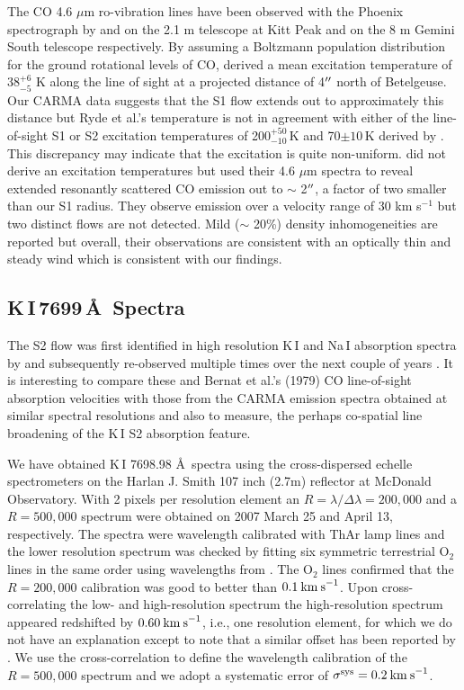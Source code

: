 \documentclass[iop]{emulateapj}
\begin{document}
The CO 4.6 $\mu$m ro-vibration lines have been observed with the Phoenix spectrograph \citep{1998SPIE.3354..810H} by \cite{1999A&A...347L..35R} and \cite{2009AJ....137.3558S} on the 2.1 m telescope at Kitt Peak and on the 8 m Gemini South telescope respectively. By assuming a Boltzmann population distribution for the ground rotational levels of CO, \cite{1999A&A...347L..35R}  derived a mean excitation temperature of 38${}^{+6}_{-5}$ K along the line of sight at a projected distance of 4$\mbox{$^{\prime\prime}$}$ north of Betelgeuse. Our CARMA data suggests that the S1 flow extends out to approximately this distance but Ryde et al.'s temperature is not in agreement with either of the line-of-sight S1 or S2 excitation temperatures of 200${}^{+50}_{-10}$\,K and 70$\pm 10$\,K derived by \cite{1979ApJ...233L.135B}. This discrepancy may indicate that the excitation is quite non-uniform.
\cite{2009AJ....137.3558S} did not derive an excitation temperatures but used their 4.6 $\mu$m spectra to reveal extended resonantly scattered CO emission out to $\sim$ 2$\mbox{$^{\prime\prime}$}$, a factor of two smaller than our S1 radius. They observe emission over a velocity range of 30 km s${}^{-1}$ but two distinct flows are not detected. Mild ($\sim$ 20\%) density inhomogeneities are reported but overall, their observations are consistent with an optically thin and steady wind which is consistent with our findings.

\subsection{K\,I\,7699\,\AA \ Spectra}

The S2 flow was first identified in high resolution K\,I and Na\,I absorption spectra by \cite{1975ApJ...199..427G} and subsequently re-observed multiple times over the next couple of years \citep{1979QJRAS..20..361G}. It is interesting to compare these and Bernat et al.'s (1979) CO line-of-sight absorption velocities with those from the CARMA emission spectra obtained at similar spectral resolutions and also to measure, the perhaps co-spatial line broadening of the K\,I S2 absorption feature.

We have obtained K\,I 7698.98 \AA \ spectra using the cross-dispersed echelle spectrometers on the Harlan J. Smith 107 inch (2.7m) reflector at McDonald Observatory. With 2 pixels per resolution element an $R=\lambda/\Delta\lambda=200,000$ and a $R=500,000$ spectrum were obtained on 2007 March 25 and April 13, respectively. The spectra were wavelength calibrated with ThAr lamp lines and the lower resolution spectrum was checked by fitting six symmetric terrestrial O${}_2$ lines in the same order using wavelengths from \cite{1948ApJ...108..167B}. The O${}_2$ lines confirmed that the $R=200,000$ calibration was good to better than $0.1\>{\rm km\>s}^{-1}$. Upon cross-correlating the low- and high-resolution spectrum the high-resolution spectrum appeared redshifted by $0.60\>{\rm km\>s}^{-1}$, i.e., one resolution element, for which we do not have an explanation except to note that a similar offset has been reported by \cite{1994ApJ...436..152W}. We use the cross-correlation to define the wavelength calibration of the $R=500,000$ spectrum and we adopt a systematic error of $\sigma^{\rm{sys}}=0.2\>{\rm km\>s}^{-1}$.
\end{document}
